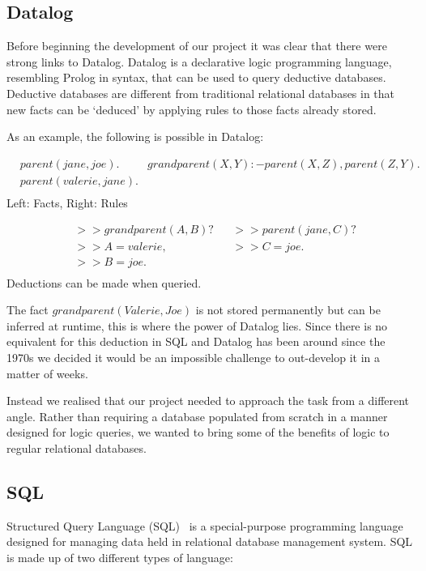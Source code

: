 \documentclass[a4paper, 11pt]{article}
\begin{document}
  \subsection{Datalog}
    Before beginning the development of our project it was clear that there were
    strong links to Datalog. Datalog is a declarative logic programming language,
    resembling Prolog in syntax, that can be used to query deductive databases.
    Deductive databases are different from traditional relational databases in that
    new facts can be `deduced' by applying rules to those facts already stored.

    As an example, the following is possible in Datalog:
    \begin{center}
      \begin{align*}
        &parent(jane, joe). & grandparent(X, Y) :- parent(X, Z), parent(Z, Y).\\
        &parent(valerie, jane). & \\
      \end{align*}
      Left: Facts, Right: Rules

      \begin{align*}
        &>> grandparent(A, B)?  & & >> parent(jane, C)? \\
        &>> A = valerie,        & & >> C = joe. \\
        &>> B = joe.            & & \\
      \end{align*}
      Deductions can be made when queried.
    \end{center}

    The fact $grandparent(Valerie, Joe)$ is not stored permanently but can be
    inferred at runtime, this is where the power of Datalog lies. Since there is no
    equivalent for this deduction in SQL and Datalog has been around since the 1970s
    we decided it would be an impossible challenge to out-develop it in a matter of
    weeks.

    Instead we realised that our project needed to approach the task from a
    different angle. Rather than requiring a database populated from scratch in a
    manner designed for logic queries, we wanted to bring some of the benefits of
    logic to regular relational databases.

  \subsection{SQL}
    Structured Query Language (SQL)~\cite{wiki:SQL} is a special-purpose
    programming language designed for managing data held in relational database
    management system. SQL is made up of two different types of language:
\end{document}
